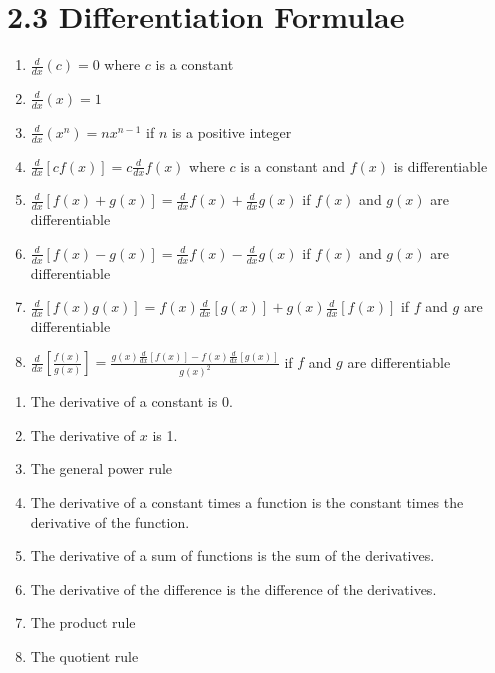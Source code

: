 %
%

\section*{2.3 Differentiation Formulae}

\begin{enumerate}
    \item \(\frac{d}{dx}(c)=0\) \quad where \(c\) is a constant
    \item \(\frac{d}{dx}(x)=1\)
    \item \(\frac{d}{dx}(x^n)=nx^{n-1}\) \quad if \(n\) is a positive integer
    \item \(\frac{d}{dx}[cf(x)]=c\frac{d}{dx}f(x)\) \quad where \(c\) is a constant and \(f(x)\) is differentiable
    \item \(\frac{d}{dx}[f(x)+g(x)]=\frac{d}{dx}f(x)+\frac{d}{dx}g(x)\) \quad if \(f(x)\) and \(g(x)\) are differentiable
    \item \(\frac{d}{dx}[f(x)-g(x)]=\frac{d}{dx}f(x)-\frac{d}{dx}g(x)\) \quad if \(f(x)\) and \(g(x)\) are differentiable
    \item \(\frac{d}{dx}[f(x)g(x)]=f(x)\frac{d}{dx}[g(x)]+g(x)\frac{d}{dx}[f(x)]\) \quad if \(f\) and \(g\) are differentiable
    \item \(\frac{d}{dx}[\frac{f(x)}{g(x)}]=\frac{g(x)\frac{d}{dx}[f(x)]-f(x)\frac{d}{dx}[g(x)]}{g{(x)}^2}\) \quad if \(f\) and \(g\) are differentiable
\end{enumerate}
\begin{enumerate}
    \item The derivative of a constant is 0.
    \item The derivative of \(x\) is 1.
    \item The general power rule
    \item The derivative of a constant times a function is the constant times the derivative of the function.
    \item The derivative of a sum of functions is the sum of the derivatives.
    \item The derivative of the difference is the difference of the derivatives.
    \item The product rule
    \item The quotient rule
\end{enumerate}
